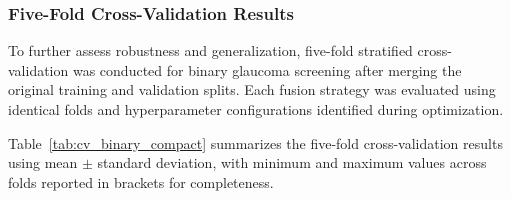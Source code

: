 \documentclass[preprint,12pt]{elsarticle}
\begin{document}
\subsubsection{Five-Fold Cross-Validation Results}
\label{subsubsec:cv_binary}

To further assess robustness and generalization, five-fold stratified cross-validation was conducted for binary glaucoma screening after merging the original training and validation splits. Each fusion strategy was evaluated using identical folds and hyperparameter configurations identified during optimization.

Table~\ref{tab:cv_binary_compact} summarizes the five-fold cross-validation results using mean $\pm$ standard deviation, with minimum and maximum values across folds reported in brackets for completeness.
\end{document}

